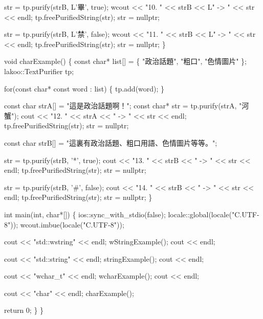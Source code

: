 \begin{DoxyCode}
    str = tp.purify(strB, L'畢', true);
    wcout << "10. " << strB << L" -> " << str << endl;
    tp.freePurifiedString(str);
    str = nullptr;

    str = tp.purify(strB, L'禁', false);
    wcout << "11. " << strB << L" -> " << str << endl;
    tp.freePurifiedString(str);
    str = nullptr;
\}

void charExample()
\{
    const char* list[] = \{ "政治話題", "粗口", "色情圖片" \};
    lakoo::TextPurifier tp;

    for(const char* const word : list)
    \{
        tp.add(word);
    \}

    const char strA[] = "這是政治話題啊！";
    const char* str = tp.purify(strA, "河蟹");
    cout << "12. " << strA << " -> " << str << endl;
    tp.freePurifiedString(str);
    str = nullptr;

    const char strB[] = "這裏有政治話題、粗口用語、色情圖片等等。";

    str = tp.purify(strB, '*', true);
    cout << "13. " << strB << " -> " << str << endl;
    tp.freePurifiedString(str);
    str = nullptr;

    str = tp.purify(strB, '#', false);
    cout << "14. " << strB << " -> " << str << endl;
    tp.freePurifiedString(str);
    str = nullptr;
\}

int main(int, char*[])
\{
    ios::sync\_with\_stdio(false);
    locale::global(locale("C.UTF-8"));
    wcout.imbue(locale("C.UTF-8"));

    cout << "std::wstring" << endl;
    wStringExample();
    cout << endl;

    cout << "std::string" << endl;
    stringExample();
    cout << endl;

    cout << "wchar\_t" << endl;
    wcharExample();
    cout << endl;

    cout << "char" << endl;
    charExample();

    return 0;
\}
\}
\end{DoxyCode}



